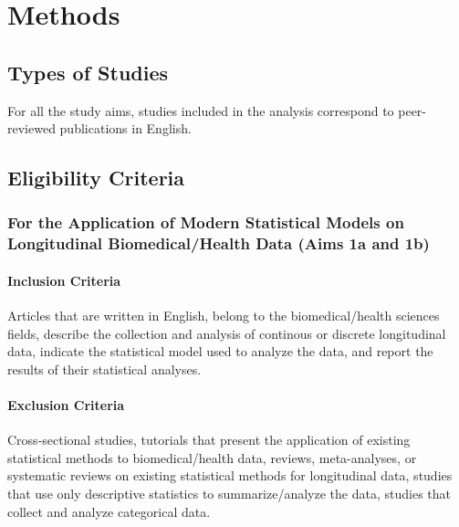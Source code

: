 \documentclass[
]{article}
\let\oldparagraph\paragraph
\renewcommand{\paragraph}[1]{\oldparagraph{#1}\mbox{}}
\begin{document}
\hypertarget{methods}{%
\section{Methods}\label{methods}}

\hypertarget{types-of-studies}{%
\subsection{Types of Studies}\label{types-of-studies}}

For all the study aims, studies included in the analysis correspond to
peer-reviewed publications in English.

\hypertarget{eligibility-criteria}{%
\subsection{Eligibility Criteria}\label{eligibility-criteria}}

\hypertarget{for-the-application-of-modern-statistical-models-on-longitudinal-biomedicalhealth-data-aims-1a-and-1b}{%
\subsubsection{For the Application of Modern Statistical Models on
Longitudinal Biomedical/Health Data (Aims 1a and
1b)}\label{for-the-application-of-modern-statistical-models-on-longitudinal-biomedicalhealth-data-aims-1a-and-1b}}

\hypertarget{inclusion-criteria}{%
\paragraph{Inclusion Criteria}\label{inclusion-criteria}}

Articles that are written in English, belong to the biomedical/health
sciences fields, describe the collection and analysis of continous or
discrete longitudinal data, indicate the statistical model used to
analyze the data, and report the results of their statistical analyses.

\hypertarget{exclusion-criteria}{%
\paragraph{Exclusion Criteria}\label{exclusion-criteria}}

Cross-sectional studies, tutorials that present the application of
existing statistical methods to biomedical/health data, reviews,
meta-analyses, or systematic reviews on existing statistical methods for
longitudinal data, studies that use only descriptive statistics to
summarize/analyze the data, studies that collect and analyze categorical
data.
\end{document}
